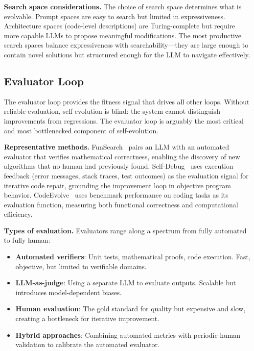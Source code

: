 \documentclass[11pt,a4paper]{article}
\begin{document}
\textbf{Search space considerations.} The choice of search space determines what is evolvable. Prompt spaces are easy to search but limited in expressiveness. Architecture spaces (code-level descriptions) are Turing-complete but require more capable LLMs to propose meaningful modifications. The most productive search spaces balance expressiveness with searchability---they are large enough to contain novel solutions but structured enough for the LLM to navigate effectively.

\subsection{Evaluator Loop}

The evaluator loop provides the fitness signal that drives all other loops. Without reliable evaluation, self-evolution is blind: the system cannot distinguish improvements from regressions. The evaluator loop is arguably the most critical and most bottlenecked component of self-evolution.

\textbf{Representative methods.} FunSearch~\citep{romera2024funsearch} pairs an LLM with an automated evaluator that verifies mathematical correctness, enabling the discovery of new algorithms that no human had previously found. Self-Debug~\citep{chen2024selfdebug} uses execution feedback (error messages, stack traces, test outcomes) as the evaluation signal for iterative code repair, grounding the improvement loop in objective program behavior. CodeEvolve~\citep{wang2024codeevolve} uses benchmark performance on coding tasks as its evaluation function, measuring both functional correctness and computational efficiency.

\textbf{Types of evaluation.} Evaluators range along a spectrum from fully automated to fully human:
\begin{itemize}
\item \textbf{Automated verifiers}: Unit tests, mathematical proofs, code execution. Fast, objective, but limited to verifiable domains.
\item \textbf{LLM-as-judge}: Using a separate LLM to evaluate outputs. Scalable but introduces model-dependent biases.
\item \textbf{Human evaluation}: The gold standard for quality but expensive and slow, creating a bottleneck for iterative improvement.
\item \textbf{Hybrid approaches}: Combining automated metrics with periodic human validation to calibrate the automated evaluator.
\end{itemize}
\end{document}
